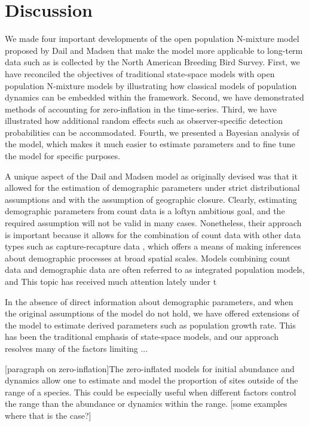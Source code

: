 \documentclass[12pt]{article}
\begin{document}
\section{Discussion}



We made four important developments of the open population
N-mixture model proposed by Dail and Madsen that make the
model more applicable to long-term data such as is collected
by the North American Breeding Bird Survey. First, we have
reconciled the objectives of traditional state-space models
with open population N-mixture models by illustrating how
classical models of population dynamics can be embedded within
the framework. Second, we have demonstrated methods of
accounting for zero-inflation in the time-series. Third, we
have illustrated how additional random effects such as
observer-specific detection probabilities can be
accommodated. Fourth, we presented a Bayesian analysis of the
model, which makes it much easier to estimate parameters and
to fine tune the model for specific purposes.

A unique aspect of the Dail and Madsen model as originally devised was
that it allowed for the estimation of demographic parameters under
strict distributional assumptions and with the assumption of
geographic closure. Clearly, estimating demographic parameters from
count data is a loftyn ambitious goal, and the required assumption
will not be valid in many cases. Nonetheless, their approach is
important because it allows for the combination of count data with
other data types such as capture-recapture data , which offers a
means of making inferences about demographic processes at broad
spatial scales. Models combining count data and demographic data are
often referred to as integrated population models, and This topic has
received much attention lately under t

In the absence of direct information about demographic parameters, and
when the original assumptions of the model do not hold, we have
offered extensions of the model to estimate derived parameters such as
population growth rate. This has been the traditional emphasis of
state-space models, and our approach resolves many of the factors
limiting ...

[paragraph on zero-inflation]The zero-inflated models for initial
abundance and dynamics allow one to estimate and model the proportion
of sites outside of the range of a species.  This could be especially
useful when different factors control the range than the abundance or
dynamics within the range.  [some examples where that is the case?]
\end{document}
